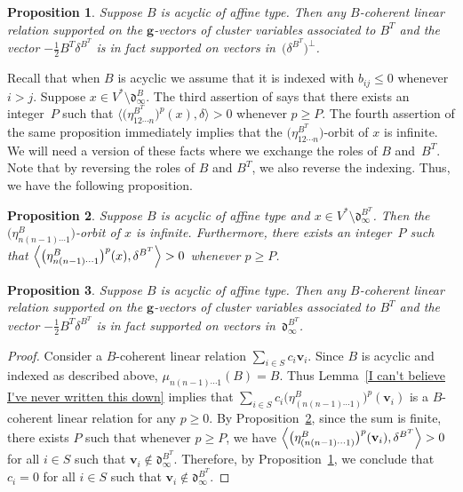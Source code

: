 \documentclass{amsart}
\newtheorem{proposition}{Proposition}[section]
\theoremstyle{definition}
\theoremstyle{remark}
\numberwithin{equation}{section}
\newcommand{\brr}[1]{{\bigl\langle #1 \bigr\rangle}}
\newcommand{\brrr}[1]{{\Bigl\langle #1 \Bigr\rangle}}
\newcommand{\0}{{\mathbf{0}}}
\newcommand{\g}{\mathbf{g}}
\renewcommand{\v}{\mathbf{v}}
\renewcommand{\d}{{\mathfrak d}}
\begin{document}
\begin{proposition}\label{Tits B-coherent}
Suppose $B$ is acyclic of affine type.
Then any $B$-coherent linear relation supported on the $\g$-vectors of cluster variables associated to $B^T$ and the vector $-\frac12B^T\delta^{B^T}$ is in fact supported on vectors in~$\bigl(\delta^{B^T}\bigr)^\perp$.
\end{proposition}

Recall that when $B$ is acyclic we assume that it is indexed with $b_{ij}\leq 0$ whenever $i>j$.
Suppose $x\in V^*\setminus\d_\infty^B$.
The third assertion of \cite[Proposition~4.17]{affdomreg} says that there exists an integer~$P$ such that $\brr{\bigl(\eta_{12\cdots n}^{B^T}\bigr)^p(x),\delta}>0$ whenever $p\ge P$.
The fourth assertion of the same proposition immediately implies that the $\bigl(\eta_{12\cdots n}^{B^T}\bigr)$-orbit of $x$ is infinite.
We will need a version of these facts where we exchange the roles of $B$ and~$B^T$.
Note that by reversing the roles of $B$ and $B^T$, we also reverse the indexing.
Thus, we have the following proposition.

\begin{proposition}\label{everything to Tits}
Suppose $B$ is acyclic of affine type and $x\in V^*\setminus\d_\infty^{B^T}$.
Then the $\bigl(\eta_{n(n-1)\cdots1}^B\bigr)$-orbit of $x$ is infinite.
Furthermore, there exists an integer~$P$ such that $\brrr{\bigl(\eta_{n(n-1)\cdots1}^B\bigr)^p(x),\delta^{B^T}}>0$ whenever $p\ge P$.
\end{proposition} 

\begin{proposition}\label{im wall B-coherent}
Suppose $B$ is acyclic of affine type.
Then any $B$-coherent linear relation supported on the $\g$-vectors of cluster variables associated to $B^T$ and the vector $-\frac12B^T\delta^{B^T}$ is in fact supported on vectors in~$\d_\infty^{B^T}$.
\end{proposition}
\begin{proof}
Consider a $B$-coherent linear relation $\sum_{i\in S}c_i\v_i$.
Since $B$ is acyclic and indexed as described above, $\mu_{n(n-1)\cdots1}(B)=B$.
Thus Lemma~\ref{I can't believe I've never written this down} implies that $\sum_{i\in S}c_i\bigl(\eta^B_{(n(n-1)\cdots1)}\bigr)^p(\v_i)$ is a $B$-coherent linear relation for any $p\ge0$.
By Proposition~\ref{everything to Tits}, since the sum is finite, there exists $P$ such that whenever $p\ge P$, we have ${\brrr{\bigl(\eta^B_{(n(n-1)\cdots1)}\bigr)^p(\v_i),\delta^{B^T}}>0}$ for all $i\in S$ such that $\v_i\not\in\d_\infty^{B^T}$.
Therefore, by Proposition~\ref{Tits B-coherent}, we conclude that $c_i=0$ for all $i\in S$ such that $\v_i\not\in\d_\infty^{B^T}$.
\end{proof}
\end{document}
